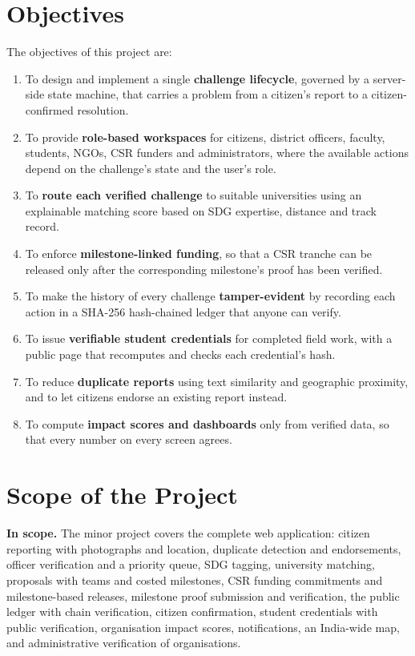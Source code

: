 \section{Objectives}
The objectives of this project are:
\begin{enumerate}
  \item To design and implement a single \textbf{challenge lifecycle}, governed by a server-side state machine, that carries a problem from a citizen's report to a citizen-confirmed resolution.
  \item To provide \textbf{role-based workspaces} for citizens, district officers, faculty, students, NGOs, CSR funders and administrators, where the available actions depend on the challenge's state and the user's role.
  \item To \textbf{route each verified challenge} to suitable universities using an explainable matching score based on SDG expertise, distance and track record.
  \item To enforce \textbf{milestone-linked funding}, so that a CSR tranche can be released only after the corresponding milestone's proof has been verified.
  \item To make the history of every challenge \textbf{tamper-evident} by recording each action in a SHA-256 hash-chained ledger that anyone can verify.
  \item To issue \textbf{verifiable student credentials} for completed field work, with a public page that recomputes and checks each credential's hash.
  \item To reduce \textbf{duplicate reports} using text similarity and geographic proximity, and to let citizens endorse an existing report instead.
  \item To compute \textbf{impact scores and dashboards} only from verified data, so that every number on every screen agrees.
\end{enumerate}

\section{Scope of the Project}
\textbf{In scope.} The minor project covers the complete web application: citizen reporting with photographs and location, duplicate detection and endorsements, officer verification and a priority queue, SDG tagging, university matching, proposals with teams and costed milestones, CSR funding commitments and milestone-based releases, milestone proof submission and verification, the public ledger with chain verification, citizen confirmation, student credentials with public verification, organisation impact scores, notifications, an India-wide map, and administrative verification of organisations.

